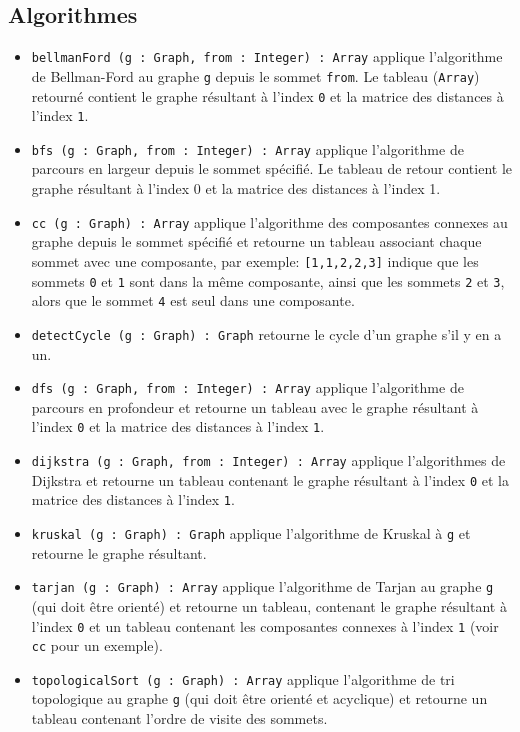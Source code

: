 \documentclass[french]{article}
\begin{document}
		\subsection{Algorithmes}
		\begin{itemize}
			\item \texttt{bellmanFord (g : Graph, from : Integer) : Array} applique l'algorithme de Bellman-Ford au graphe \texttt{g} depuis le sommet \texttt{from}. Le tableau (\texttt{Array}) retourné contient le graphe résultant à l'index \texttt{0} et la matrice des distances à l'index \texttt{1}.
			\item \texttt{bfs (g : Graph, from : Integer) : Array} applique l'algorithme de parcours en largeur depuis le sommet spécifié. Le tableau de retour contient le graphe résultant à l'index 0 et la matrice des distances à l'index 1.
			\item \texttt{cc (g : Graph) : Array} applique l'algorithme des composantes connexes au graphe depuis le sommet spécifié et retourne un tableau associant chaque sommet avec une composante, par exemple: \texttt{[1,1,2,2,3]} indique que les sommets \texttt{0} et \texttt{1} sont dans la même composante, ainsi que les sommets \texttt{2} et \texttt{3}, alors que le sommet \texttt{4} est seul dans une composante.
			\item \texttt{detectCycle (g : Graph) : Graph} retourne le cycle d'un graphe s'il y en a un.
			\item \texttt{dfs (g : Graph, from : Integer) : Array} applique l'algorithme de parcours en profondeur et retourne un tableau avec le graphe résultant à l'index \texttt{0} et la matrice des distances à l'index \texttt{1}.
			\item \texttt{dijkstra (g : Graph, from : Integer) : Array} applique l'algorithmes de Dijkstra et retourne un tableau contenant le graphe résultant à l'index \texttt{0} et la matrice des distances à l'index \texttt{1}.
			\item \texttt{kruskal (g : Graph) : Graph} applique l'algorithme de Kruskal à \texttt{g} et retourne le graphe résultant.
			\item \texttt{tarjan (g : Graph) : Array} applique l'algorithme de Tarjan au graphe \texttt{g} (qui doit être orienté) et retourne un tableau, contenant le graphe résultant à l'index \texttt{0} et un tableau contenant les composantes connexes à l'index \texttt{1} (voir \texttt{cc} pour un exemple).
			\item \texttt{topologicalSort (g : Graph) : Array} applique l'algorithme de tri topologique au graphe \texttt{g} (qui doit être orienté et acyclique) et retourne un tableau contenant l'ordre de visite des sommets.

\end{itemize}
\end{document}
